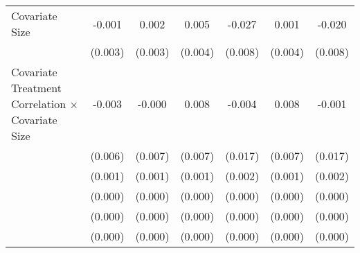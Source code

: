 \begin{table}[htbp]
\begin{tabular}{l*{6}{c}}
Covariate Size      &      -0.001         &       0.002         &       0.005         &      -0.027\sym{**} &       0.001         &      -0.020\sym{*}  \\
                    &     (0.003)         &     (0.003)         &     (0.004)         &     (0.008)         &     (0.004)         &     (0.008)         \\
Covariate Treatment Correlation $\times$ Covariate Size&      -0.003         &      -0.000         &       0.008         &      -0.004         &       0.008         &      -0.001         \\
                    &     (0.006)         &     (0.007)         &     (0.007)         &     (0.017)         &     (0.007)         &     (0.017)         \\
                    &     (0.001)         &     (0.001)         &     (0.001)         &     (0.002)         &     (0.001)         &     (0.002)         \\
                    &     (0.000)         &     (0.000)         &     (0.000)         &     (0.000)         &     (0.000)         &     (0.000)         \\
                    &     (0.000)         &     (0.000)         &     (0.000)         &     (0.000)         &     (0.000)         &     (0.000)         \\
                    &     (0.000)         &     (0.000)         &     (0.000)         &     (0.000)         &     (0.000)         &     (0.000)         \\

\end{tabular}
\end{table}
